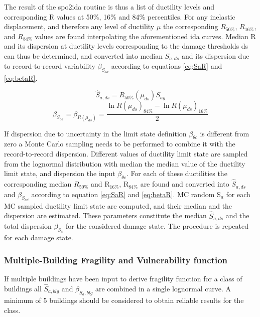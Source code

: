 The result of the spo2ida routine is thus a list of ductility levels and corresponding R values at 50\%, 16\% and 84\% percentiles. For any inelastic displacement, and therefore any level of ductility $\mu$ the corresponding $R_{50\%}$, $R_{16\%}$, and $R_{84\%}$ values are found interpolating the aforementioned ida curves.
Median R and its dispersion at ductility levels corresponding to the damage thresholds ds can thus be determined, and converted into median $S_{a, ds}$ and its dispersion due to record-to-record variability $\beta_{S_{a d}}$ according to equations \ref{eq:SaR} and \ref{eq:betaR}. 

\begin{equation}
\hat{S}_{a, ds} = R_{50\%}(\mu_{ds}) S_{ay}
\label{eq:SaR}
\end{equation}
\begin{equation}
\beta_{S_{a d}} = \beta_{R(\mu_{ds})} = \frac{\ln R(\mu_{ds})_{84\%} - \ln R(\mu_{ds})_{16\%}}{2}
\label{eq:betaR}
\end{equation} 

If dispersion due to uncertainty in the limit state definition $\beta_{\theta c}$ is different from zero a Monte Carlo sampling needs to be performed to combine it with the record-to-record dispersion. Different values of ductility limit state are sampled from the  lognormal distribution with median the median value of the ductility limit state, and dispersion the input $\beta_{\theta c}$. For each of these ductilities the corresponding median $R_{50\%}$ and R$_{16\%}$, R$_{84\%}$ are found and converted into $\hat{S}_{a,ds}$ and $\beta_{S_{a d}}$ according to equation \ref{eq:SaR} and \ref{eq:betaR}. MC random S$_a$ for each MC sampled ductility limit state are computed, and their median and the dispersion are estimated. These parameters constitute the median $\hat{S}_{a,ds}$ and the total dispersion $\beta_{S_a}$ for the considered damage state. The procedure is repeated for each damage state.

\subsubsection{Multiple-Building Fragility and Vulnerability function}
\label{subsubsec:multiple-buildings}
If multiple buildings have been input to derive fragility function for a class of buildings all $\hat{S}_{a, blg}$ and $\beta_{S_a, blg}$ are combined in a single lognormal curve. A minimum of 5 buildings should be considered to obtain reliable results for the class.\\

